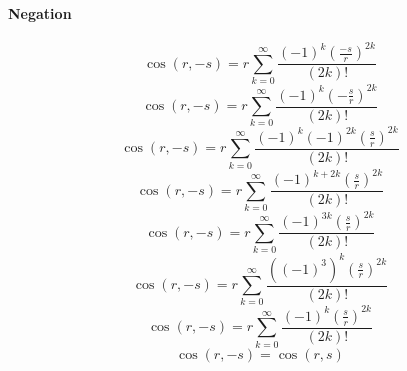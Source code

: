 \documentclass[a4paper,12pt]{report}
\begin{document}
\paragraph{Negation}
\begin{equation}
\cos(r,-s) = r \sum \limits_{k=0}^{\infty} \frac{(-1)^k \left(\frac{-s}{r}\right)^{2k}}{(2k)!}
\end{equation}
\begin{equation}
\cos(r,-s) = r \sum \limits_{k=0}^{\infty} \frac{(-1)^k \left(-\frac{s}{r}\right)^{2k}}{(2k)!}
\end{equation}
\begin{equation}
\cos(r,-s) = r \sum \limits_{k=0}^{\infty} \frac{(-1)^k (-1)^{2k} \left(\frac{s}{r}\right)^{2k}}{(2k)!}
\end{equation}
\begin{equation}
\cos(r,-s) = r \sum \limits_{k=0}^{\infty} \frac{(-1)^{k+2k} \left(\frac{s}{r}\right)^{2k}}{(2k)!}
\end{equation}
\begin{equation}
\cos(r,-s) = r \sum \limits_{k=0}^{\infty} \frac{(-1)^{3k} \left(\frac{s}{r}\right)^{2k}}{(2k)!}
\end{equation}
\begin{equation}
\cos(r,-s) = r \sum \limits_{k=0}^{\infty} \frac{((-1)^3)^k \left(\frac{s}{r}\right)^{2k}}{(2k)!}
\end{equation}
\begin{equation}
\cos(r,-s) = r \sum \limits_{k=0}^{\infty} \frac{(-1)^k \left(\frac{s}{r}\right)^{2k}}{(2k)!}
\end{equation}
\begin{equation}
\cos(r,-s) = \cos(r,s)
\end{equation}
\end{document}
